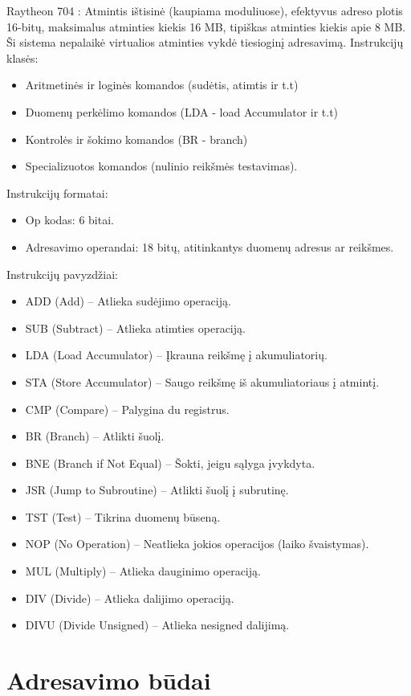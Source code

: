 \documentclass{article}
\begin{document}
Raytheon 704 : Atmintis ištisinė (kaupiama moduliuose), efektyvus adreso plotis 16-bitų, maksimalus atminties kiekis 16 MB, tipiškas atminties kiekis apie 8 MB. Ši sistema nepalaikė virtualios atminties vykdė tiesioginį adresavimą.
Instrukcijų klasės:
\begin{itemize}
    \item Aritmetinės ir loginės komandos (sudėtis, atimtis ir t.t)
     \item Duomenų perkėlimo komandos (LDA - load Accumulator ir t.t)
    \item Kontrolės ir šokimo komandos (BR - branch)
    \item Specializuotos komandos (nulinio reikšmės testavimas).
\end{itemize}
Instrukcijų formatai:
\begin{itemize}
    \item Op kodas: 6 bitai.
    \item Adresavimo operandai: 18 bitų, atitinkantys duomenų adresus ar reikšmes.
\end{itemize}
Instrukcijų pavyzdžiai:
\begin{itemize}
    \item ADD (Add) – Atlieka sudėjimo operaciją.
    \item SUB (Subtract) – Atlieka atimties operaciją.
    \item LDA (Load Accumulator) – Įkrauna reikšmę į akumuliatorių.
    \item STA (Store Accumulator) – Saugo reikšmę iš akumuliatoriaus į atmintį.
    \item CMP (Compare) – Palygina du registrus.
    \item BR (Branch) – Atlikti šuolį.
    \item BNE (Branch if Not Equal) – Šokti, jeigu sąlyga įvykdyta.
    \item JSR (Jump to Subroutine) – Atlikti šuolį į subrutinę.
    \item TST (Test) – Tikrina duomenų būseną.
    \item NOP (No Operation) – Neatlieka jokios operacijos (laiko švaistymas).
    \item MUL (Multiply) – Atlieka dauginimo operaciją.
    \item DIV (Divide) – Atlieka dalijimo operaciją.
    \item DIVU (Divide Unsigned) – Atlieka nesigned dalijimą.
\end{itemize}
\section*{Adresavimo būdai}
\end{document}

